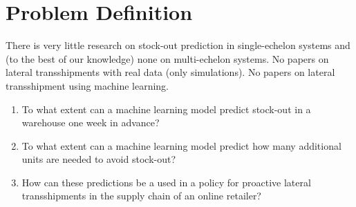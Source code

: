 \documentclass[../../main.tex]{subfiles}
\begin{document}
\section{Problem Definition}

There is very little research on stock-out prediction in single-echelon systems and (to the best of our knowledge) none on multi-echelon systems. No papers on lateral transshipments with real data (only simulations). No papers on lateral transshipment using machine learning.

\begin{enumerate}
\item To what extent can a machine learning model predict stock-out in a warehouse one week in advance?
\item To what extent can a machine learning model predict how many additional units are needed to avoid stock-out?
\item How can these predictions be a used in a policy for proactive lateral transshipments in the supply chain of an online retailer?
\end{enumerate}


\end{document}
